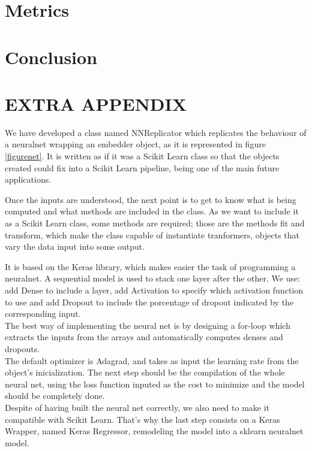 \documentclass[a4paper,11pt,spanish]{report}
\begin{document}

\chapter{Metrics}
\label{chap:met}



\chapter{Conclusion}
\label{chap:conc}



\chapter{EXTRA APPENDIX}
\label{chap:append}

We have developed a class named NNReplicator which replicates the behaviour of a neuralnet wrapping an embedder object, as it is represented in figure \ref{figurenet}. It is written as if it was a Scikit Learn class so that the objects created could fix into a Scikit Learn pipeline, being one of the main future applications.

Once the inputs are understood, the next point is to get to know what is being computed and what methods are included in the class. As we want to include it as a Scikit Learn class, some methods are required; those are the methods fit and transform, which make the class capable of instantiate tranformers, objects that vary the data input into some output.

It is based on the Keras library, which makes easier the task of programming a neuralnet. A sequential model is used to stack one layer after the other. We use: add Dense to include a layer, add Activation to specify which activation function to use and add Dropout to include the porcentage of dropout indicated by the corresponding input.\\
The best way of implementing the neural net is by designing a for-loop which extracts the inputs from the arrays and automatically computes denses and dropouts.\\
The default optimizer is Adagrad, and takes as input the learning rate from the object's inicialization. The next step should be the compilation of the whole neural net, using the loss function inputed as the cost to minimize and the model should be completely done.\\
Despite of having built the neural net correctly, we also need to make it compatible with Scikit Learn. That's why the last step consists on a Keras Wrapper, named Keras Regressor, remodeling the model into a sklearn neuralnet model.
\end{document}
